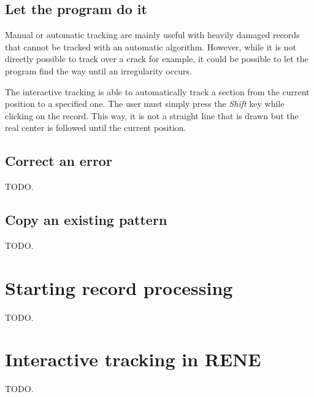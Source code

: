 \subsection{Let the program do it}

Manual or automatic tracking are mainly useful with heavily damaged records that cannot be tracked with an automatic algorithm. However, while it is not directly possible to track over a crack for example, it could be possible to let the program find the way until an irregularity occurs.

The interactive tracking is able to automatically track a section from the current position to a specified one. The user must simply press the \emph{Shift} key while clicking on the record. This way, it is not a straight line that is drawn but the real center is followed until the current position.

\subsection{Correct an error}

TODO.

\subsection{Copy an existing pattern}

TODO.

\section{Starting record processing}

TODO.

\section{Interactive tracking in RENE}
\label{sec:inttrackrene}

TODO.